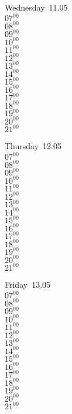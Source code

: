 \documentclass[11pt,a4paper]{book}\usepackage[]{graphicx}\usepackage[]{color}
\begin{document}
\begin{weekdaybox}
  Wednesday~11.05\\
  { 
  \vfill
  $07^{00}$\\
$08^{00}$\\
$09^{00}$\\
$10^{00}$\\
$11^{00}$\\
$12^{00}$\\
$13^{00}$\\
$14^{00}$\\
$15^{00}$\\
$16^{00}$\\
$17^{00}$\\
$18^{00}$\\
$19^{00}$\\
$20^{00}$\\
$21^{00}$\\
  }
\end{weekdaybox}
\clearpage
\begin{headerbox}
\end{headerbox}
\begin{weekdaybox}
  Thursday~12.05\\
  { 
  \vfill
  $07^{00}$\\
$08^{00}$\\
$09^{00}$\\
$10^{00}$\\
$11^{00}$\\
$12^{00}$\\
$13^{00}$\\
$14^{00}$\\
$15^{00}$\\
$16^{00}$\\
$17^{00}$\\
$18^{00}$\\
$19^{00}$\\
$20^{00}$\\
$21^{00}$\\
  }
\end{weekdaybox} 
\begin{weekdaybox}
  Friday~13.05\\
  { 
  \vfill
  $07^{00}$\\
$08^{00}$\\
$09^{00}$\\
$10^{00}$\\
$11^{00}$\\
$12^{00}$\\
$13^{00}$\\
$14^{00}$\\
$15^{00}$\\
$16^{00}$\\
$17^{00}$\\
$18^{00}$\\
$19^{00}$\\
$20^{00}$\\
$21^{00}$\\
  }
\end{weekdaybox}
\end{document}
